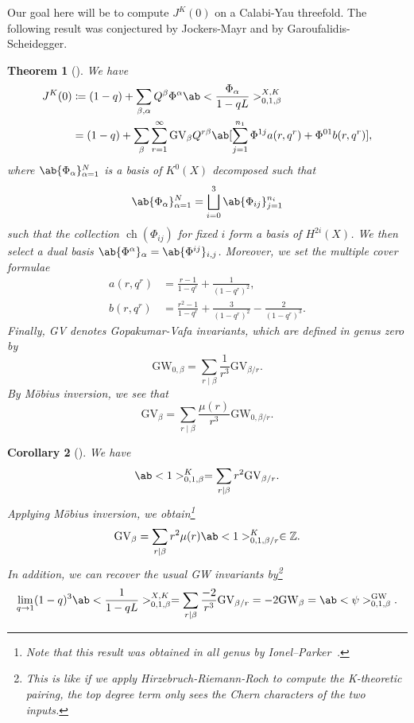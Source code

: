 \documentclass{amsart}
\newtheorem{thm}{Theorem}[section]
\newtheorem{cor}[thm]{Corollary}
\theoremstyle{definition}
\theoremstyle{remark}
\theoremstyle{plain}
\theoremstyle{definition}
\theoremstyle{remark}
\newcommand{\Z}{\mathbb{Z}}
\newcommand{\mr}[1]{\mathrm{#1}}
\newcommand{\1}{\mathbf{1}}
\newcommand{\2}{\mathbf{2}}
\newcommand{\3}{\mathbf{3}}
\DeclareMathOperator{\ch}{ch}
\begin{document}
Our goal here will be to compute \(J^K(0)\) on a Calabi-Yau threefold. The following result was conjectured by Jockers-Mayr and by Garoufalidis-Scheidegger.

\begin{thm}[{\cite{ChouLee2025}}]
    We have
    \begin{align*}
        J^K(0) &\coloneqq (1-q) + \sum_{\beta, \alpha} Q^{\beta} \Phi^{\alpha} \ab<\frac{\Phi_{\alpha}}{1-qL}>_{0,1,\beta}^{X,K} \\
        &= (1-q) + \sum_{\beta} \sum_{r=1}^{\infty} \mr{GV}_{\beta} Q^{r\beta} \ab[\sum_{j=1}^{n_1} \Phi^{1j} a(r, q^r) + \Phi^{01} b(r, q^r)],
    \end{align*}
    where \(\ab\{\Phi_{\alpha}\}_{\alpha=1}^N\) is a basis of \(K^0(X)\) decomposed such that
    \[ \ab\{\Phi_{\alpha}\}_{\alpha=1}^N = \bigsqcup_{i=0}^3 \ab\{\Phi_{ij}\}_{j=1}^{n_i} \]
    such that the collection \(\ch(\Phi_{ij})\) for fixed \(i\) form a basis of \(H^{2i}(X)\). We then select a dual basis \(\ab\{\Phi^{\alpha}\}_{\alpha} = \ab\{\Phi^{ij}\}_{i,j}\). Moreover, we set the multiple cover formulae
    \begin{align*}
        a(r, q^r) &= \frac{r-1}{1-q^r} + \frac{1}{(1-q^r)^2}, \\
        b(r, q^r) &= \frac{r^2-1}{1-q^r} + \frac{3}{(1-q^r)^2} - \frac{2}{(1-q^r)^3}.
    \end{align*}
    Finally, GV denotes Gopakumar-Vafa invariants, which are defined in genus zero by
    \[ \mr{GW}_{0,\beta} = \sum_{r \mid \beta} \frac{1}{r^3} \mr{GV}_{\beta/r}. \]
    By M\"obius inversion, we see that
    \[ \mr{GV}_{\beta} = \sum_{r \mid \beta} \frac{\mu(r)}{r^3} \mr{GW}_{0,\beta/r}. \]
\end{thm}

\begin{cor}[{\cite{ChouLee2025}}]
    We have
    \[ \ab<1>_{0,1,\beta}^K = \sum_{r \mid \beta} r^2 \mr{GV}_{\beta/r}. \]
    Applying M\"obius inversion, we obtain\footnote{Note that this result was obtained in all genus by Ionel--Parker~\cite{IonelParker2018}.}
    \[ \mr{GV}_{\beta} = \sum_{r \mid \beta} r^2 \mu(r) \ab<1>_{0,1,\beta/r}^K \in \Z. \]
    In addition, we can recover the usual GW invariants by\footnote{This is like if we apply Hirzebruch-Riemann-Roch to compute the K-theoretic pairing, the top degree term only sees the Chern characters of the two inputs.}
    \[ \lim_{q \to 1} (1-q)^3 \ab<\frac{1}{1-qL}>_{0,1,\beta}^{X,K} = \sum_{r \mid \beta} \frac{-2}{r^3} \mr{GV}_{\beta/r} = -2 \mr{GW}_{\beta} = \ab<\psi>_{0,1,\beta}^{\mr{GW}}. \]
\end{cor}
\end{document}
